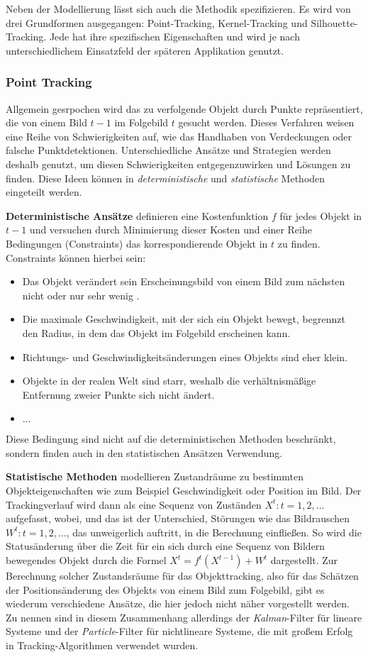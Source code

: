 Neben der Modellierung lässt sich auch die Methodik spezifizieren. Es wird von drei Grundformen ausgegangen: Point-Tracking, Kernel-Tracking und Silhouette-Tracking. Jede hat ihre spezifischen Eigenschaften und wird je nach unterschiedlichem Einsatzfeld der späteren Applikation genutzt.

\subsubsection{Point Tracking}
Allgemein gesrpochen wird das zu verfolgende Objekt durch Punkte repräsentiert, die von einem Bild $t-1$ im Folgebild $t$ gesucht werden. Dieses Verfahren weisen eine Reihe von Schwierigkeiten auf, wie das Handhaben von Verdeckungen oder falsche Punktdetektionen. Unterschiedliche Ansätze und Strategien werden deshalb genutzt, um diesen Schwierigkeiten entgegenzuwirken und Lösungen zu finden. Diese Ideen können in \textit{deterministische} und \textit{statistische} Methoden eingeteilt werden.

{\bf Deterministische Ansätze } definieren eine Kostenfunktion $f$ für jedes Objekt in $t-1$ und versuchen durch Minimierung dieser Kosten und einer Reihe Bedingungen (Constraints) das korrespondierende Objekt in $t$ zu finden. Constraints können hierbei sein:

\begin{itemize}
\item Das Objekt verändert sein Erscheinungsbild von einem Bild zum nächsten nicht oder nur sehr wenig \cite{FPIS}.
\item Die maximale Geschwindigkeit, mit der sich ein Objekt bewegt, begrennzt den Radius, in dem das Objekt im Folgebild erscheinen kann.
\item Richtungs- und Geschwindigkeitsänderungen eines Objekts sind eher klein.
\item Objekte in der realen Welt sind starr, weshalb die verhältnismäßige Entfernung zweier Punkte sich nicht ändert.
\item $\dots$
\end{itemize}
Diese Bedingung sind nicht auf die deterministischen Methoden beschränkt, sondern finden auch in den statistischen Ansätzen Verwendung.

{\bf Statistische Methoden} modellieren Zustandräume zu bestimmten Objekteigenschaften wie zum Beispiel Geschwindigkeit oder Position im Bild. Der Trackingverlauf wird dann als eine Sequenz von Zuständen $X^{t}:t=1,2,\dots$ aufgefasst, wobei, und das ist der Unterschied, Störungen wie das Bildrauschen $W^{t}:t=1,2,\dots$, das unweigerlich auftritt, in die Berechnung einfließen. So wird die Statusänderung über die Zeit für ein sich durch eine Sequenz von Bildern bewegendes Objekt durch die Formel $X^{t}=f^{t}(X^{t-1})+W^{t}$ dargestellt. Zur Berechnung solcher Zustandsräume für das Objekttracking, also für das Schätzen der Positionsänderung des Objekts von einem Bild zum Folgebild, gibt es wiederum verschiedene Ansätze, die hier jedoch nicht näher vorgestellt werden. Zu nennen sind in diesem Zusammenhang allerdings der \textit{Kalman}-Filter\cite{KAF} für lineare Systeme und der \textit{Particle}-Filter \cite{PAF} für nichtlineare Systeme, die mit großem Erfolg in Tracking-Algorithmen verwendet wurden.

